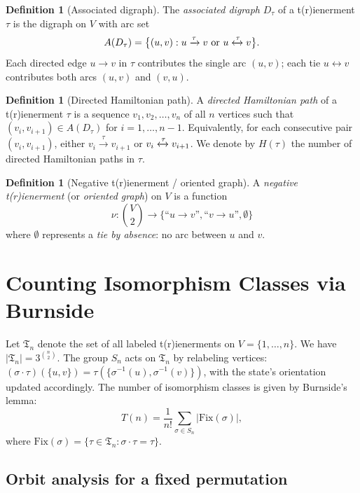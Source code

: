 \documentclass[12pt,reqno]{amsart}
\theoremstyle{definition}
\newtheorem{definition}[theorem]{Definition}
\theoremstyle{plain}
\newcommand{\Fix}{\mathrm{Fix}}
\begin{document}
\begin{definition}[Associated digraph]\label{def:digraph}
The \emph{associated digraph} $D_\tau$ of a t(r)ienerment $\tau$ is the digraph
on $V$ with arc set
\[
  A(D_\tau)=\bigl\{(u,v):u\xrightarrow{\tau}v\text{ or }u\xleftrightarrow{\tau}v\bigr\}.
\]
Each directed edge $u\to v$ in $\tau$ contributes the single arc $(u,v)$;
each tie $u\leftrightarrow v$ contributes both arcs $(u,v)$ and $(v,u)$.
\end{definition}

\begin{definition}[Directed Hamiltonian path]
A \emph{directed Hamiltonian path} of a t(r)ienerment $\tau$ is a sequence
$v_1,v_2,\ldots,v_n$ of all $n$ vertices such that $(v_i,v_{i+1})\in A(D_\tau)$
for $i=1,\ldots,n-1$.  Equivalently, for each consecutive pair $(v_i,v_{i+1})$,
either $v_i\xrightarrow{\tau}v_{i+1}$ or $v_i\xleftrightarrow{\tau}v_{i+1}$.
We denote by $H(\tau)$ the number of directed Hamiltonian paths in $\tau$.
\end{definition}

\begin{definition}[Negative t(r)ienerment / oriented graph]
A \emph{negative t(r)ienerment} (or \emph{oriented graph}) on $V$ is a function
\[
  \nu:\binom{V}{2}\to\bigl\{\text{``}u\to v\text{''}, \text{``}v\to u\text{''}, \emptyset\bigr\}
\]
where $\emptyset$ represents a \emph{tie by absence}: no arc between $u$ and $v$.
\end{definition}

\section{Counting Isomorphism Classes via Burnside}
\label{sec:burnside}

Let $\mathfrak{T}_n$ denote the set of all labeled t(r)ienerments on $V=\{1,\ldots,n\}$.
We have $|\mathfrak{T}_n|=3^{\binom{n}{2}}$.  The group $S_n$ acts on $\mathfrak{T}_n$
by relabeling vertices: $(\sigma\cdot\tau)(\{u,v\})=\tau(\{\sigma^{-1}(u),\sigma^{-1}(v)\})$,
with the state's orientation updated accordingly.  The number of isomorphism classes
is given by Burnside's lemma:
\[
  T(n)=\frac{1}{n!}\sum_{\sigma\in S_n}|\Fix(\sigma)|,
\]
where $\Fix(\sigma)=\{\tau\in\mathfrak{T}_n:\sigma\cdot\tau=\tau\}$.

\subsection{Orbit analysis for a fixed permutation}
\end{document}
